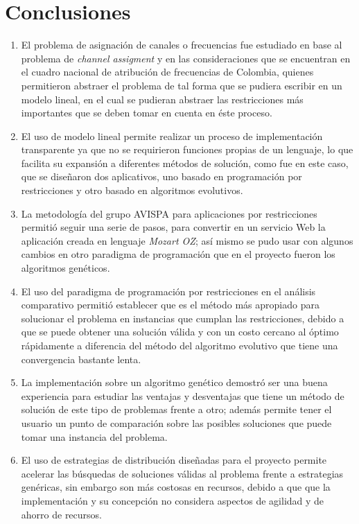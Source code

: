 \section{Conclusiones}
\begin{enumerate}
	\item El problema de asignación de canales o frecuencias fue estudiado en base al problema de \textit{channel assigment} y en las consideraciones que se encuentran en el cuadro nacional de atribución de frecuencias de Colombia, quienes permitieron abstraer el problema de tal forma que se pudiera escribir en un modelo lineal, en el cual se pudieran abstraer las restricciones más importantes que se deben tomar en cuenta en éste proceso.
	\item El uso de modelo lineal permite realizar un proceso de implementación transparente ya que no se requirieron funciones propias de un lenguaje, lo que facilita su expansión a diferentes métodos de solución, como fue en este caso, que se diseñaron dos aplicativos, uno basado en programación por restricciones y otro basado en algoritmos evolutivos.
	\item La metodología del grupo AVISPA para aplicaciones por restricciones permitió seguir una serie de pasos, para convertir en un servicio Web la aplicación creada en lenguaje \textit{Mozart OZ}; así mismo se pudo usar con algunos cambios en otro paradigma de programación que en el proyecto fueron los algoritmos genéticos.
	\item El uso del paradigma de programación por restricciones en el análisis comparativo permitió establecer que es el método más apropiado para solucionar el problema en instancias que cumplan las restricciones, debido a que se puede obtener una solución válida y con un costo cercano al óptimo rápidamente a diferencia del método del algoritmo evolutivo que tiene una convergencia bastante lenta.
	\item La implementación sobre un algoritmo genético demostró ser una buena experiencia para estudiar las ventajas y desventajas que tiene un método de solución de este tipo de problemas frente a otro; además permite tener el usuario un punto de comparación sobre las posibles soluciones que puede tomar una instancia del problema.
	\item El uso de estrategias de distribución diseñadas para el proyecto permite acelerar las búsquedas de soluciones válidas al problema frente a estrategias genéricas, sin embargo son más costosas en recursos, debido a que que la implementación y su concepción no considera aspectos de agilidad y de ahorro de recursos.

\end{enumerate}
